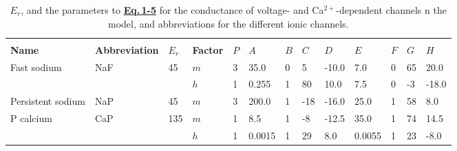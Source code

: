 \documentclass[12pt]{article}
\begin{document}
\begin{table}[h]
\label{table:T1}
\caption{$E_r$, and the parameters to \href{../pub-purkinje-deschutter1-equations1/pub-purkinje-deschutter1-equations1.tex}{\bf Eq.\,1-5} for the conductance of voltage- and Ca$^{2+}$-dependent channels n the model, and abbreviations for the different ionic channels.}        
\begin{tabular}{ l l l l l l l l l l l l l }
                                             &                                                                         &              &                       &         &                                                      &        &          &           &                &         &          &             \\
   {\bf Name}                        & {\bf Abbreviation}                                         & {$E_r$} & {\bf Factor} & $P$ & $A$                                             & $B$ & $C$ & $D$   & $E$       & $F$ & $G$  & $H$   \\
   Fast sodium                     & NaF                                                                & 45          & $m$             & 3      & 35.0                                            & 0      & 5       & -10.0 & 7.0         & 0     & 65     & 20.0   \\
                                              &                                                                         &               & $h$              & 1      & 0.255                                          & 1      & 80     & 10.0  & 7.5         & 0     & -3      & -18.0  \\
   Persistent sodium          & NaP                                                                & 45          & $m$             & 3      & 200.0                                          & 1      & -18    & -16.0 & 25.0      & 1     & 58     & 8.0      \\
   P calcium                         & CaP                                                                & 135       & $m$             & 1      & 8.5                                               & 1      & -8      & -12.5 & 35.0      & 1     & 74     & 14.5    \\
                                              &                                                                         &               & $h$              & 1      & 0.0015                                        & 1      & 29     & 8.0    & 0.0055  & 1     & 23     & -8.0    \\

\end{tabular}
\end{table}
\end{document}
